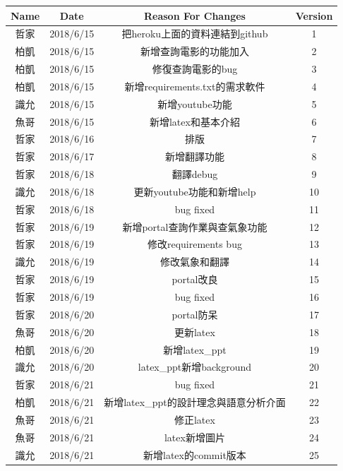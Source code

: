 \documentclass{scrreprt}
\begin{document}
\begin{CJK}{UTF8}{bkai}
\begin{center}
    \begin{tabular}{|c|c|c|c|}
        \hline
	    Name & Date & Reason For Changes & Version\\
        \hline        
	    哲家 & 2018/6/15 & 把heroku上面的資料連結到github & 1\\
        \hline        
	    柏凱 & 2018/6/15 & 新增查詢電影的功能加入 & 2\\
        \hline
	    柏凱 & 2018/6/15 & 修復查詢電影的bug & 3\\
        \hline
	    柏凱 & 2018/6/15 & 新增requirements.txt的需求軟件 & 4\\
        \hline
	    識允 & 2018/6/15 & 新增youtube功能 & 5\\
        \hline
	    魚哥 & 2018/6/15 & 新增latex和基本介紹 & 6\\
        \hline
	    哲家 & 2018/6/16 & 排版 & 7\\
        \hline
	    哲家 & 2018/6/17 & 新增翻譯功能 & 8\\
        \hline
	    哲家 & 2018/6/18 & 翻譯debug & 9\\
        \hline
	    識允 & 2018/6/18 & 更新youtube功能和新增help & 10\\
        \hline
	    哲家 & 2018/6/18 & bug fixed & 11\\
        \hline
	    哲家 & 2018/6/19 & 新增portal查詢作業與查氣象功能 & 12\\
        \hline
	    哲家 & 2018/6/19 & 修改requirements bug & 13\\
        \hline
	    識允 & 2018/6/19 & 修改氣象和翻譯 & 14\\
        \hline
	    哲家 & 2018/6/19 & portal改良 & 15\\
        \hline
	    哲家 & 2018/6/19 & bug fixed & 16\\
        \hline
	    哲家 & 2018/6/20 & portal防呆 & 17\\
        \hline
	    魚哥 & 2018/6/20 & 更新latex & 18\\
        \hline
	    柏凱 & 2018/6/20 & 新增latex_ppt & 19\\
        \hline
	    識允 & 2018/6/20 & latex_ppt新增background & 20\\
        \hline
	    哲家 & 2018/6/21 & bug fixed & 21\\
        \hline
	    柏凱 & 2018/6/21 & 新增latex_ppt的設計理念與語意分析介面 & 22\\
        \hline
	    魚哥 & 2018/6/21 & 修正latex & 23\\
        \hline
	    魚哥 & 2018/6/21 & latex新增圖片 & 24\\
        \hline
	    識允 & 2018/6/21 & 新增latex的commit版本 & 25\\
        \hline
    \end{tabular}
\end{center}


\end{CJK}
\end{document}
